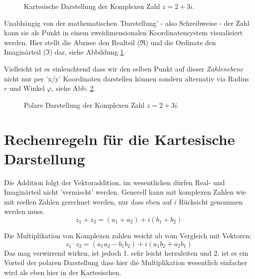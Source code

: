 \begin{figure}[h]
	\centering
	
	\caption{Kartesische Darstellung der Komplexen Zahl $z = 2 + 3i$.}
	\label{fig:komp_kart}
\end{figure}

Unabhängig von der mathematischen 'Darstellung' - also Schreibweise - der Zahl kann sie als Punkt in einem zweidimensionalen Koordinatensystem visualisiert werden. Hier stellt die Abzisse den Realteil ($\Re$) und die Ordinate den Imaginärteil ($\Im$) dar, siehe Abbildung \ref{fig:komp_kart}. 

Vielleicht ist es einleuchtend dass wir den selben Punkt auf dieser \emph{Zahlenebene} nicht nur per 'x/y' Koordinaten darstellen können sondern alternativ via Radius $r$ und Winkel $\varphi$, siehe Abb. \ref{fig:komp_pol}.


\begin{figure}[h]
	\centering
	
	\caption{Polare Darstellung der Komplexen Zahl $z = 2 + 3i$.}
	\label{fig:komp_pol}
\end{figure}




\section{Rechenregeln für die Kartesische Darstellung}

Die Addition folgt der Vektoraddition, im wesentlichen dürfen Real- und Imaginärteil nicht 'vermischt' werden. Generell kann mit komplexen Zahlen wie mit reellen Zahlen gerechnet werden, nur dass eben auf $i$ Rücksicht genommen werden muss.
\begin{equation}
z_1 + z_2 = (a_1 + a_2) + i(b_1 + b_2)
\end{equation}


Die Multiplikation von Komplexen zahlen weicht ab vom Vergleich mit Vektoren:  
\begin{equation}\label{eq:cartMult}
z_1 \cdot z_2 = (a_1 a_2 - b_1 b_2)  + i(a_1 b_2 +a_2 b_1)
\end{equation}
Das mag verwirrend wirken, ist jedoch 1. sehr leicht herzuleiten und 2. ist es ein Vorteil der polaren Darstellung dass hier die Multiplikation wesentlich einfacher wird als eben hier in der Kartesischen. 

